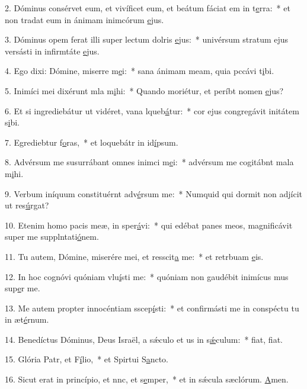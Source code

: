 2. Dóminus consérvet eum, et vivíficet eum, et beátum fáciat em in t\uline{e}rra:~* et non tradat eum in ánimam inimcórum \uline{e}jus.\par 
3. Dóminus opem ferat illi super lectum dolris \uline{e}jus:~* univérsum stratum ejus versásti in infirmtáte \uline{e}jus.\par 
4. Ego dixi: Dómine, miserre m\uline{e}i:~* sana ánimam meam, quia pccávi t\uline{i}bi.\par 
5. Inimíci mei dixérunt mla m\uline{i}hi:~* Quando moriétur, et períbt nomen \uline{e}jus?\par 
6. Et si ingrediebátur ut vidéret, vana lqueb\uline{á}tur:~* cor ejus congregávit initátem s\uline{i}bi.\par 
7. Egrediebtur f\uline{o}ras,~* et loquebátr in id\uline{í}psum.\par 
8. Advérsum me susurrábant omnes inimci m\uline{e}i:~* advérsum me cogitábnt mala m\uline{i}hi.\par 
9. Verbum iníquum constituérnt adv\uline{é}rsum me:~* Numquid qui dormit non adjícit ut res\uline{ú}rgat?\par 
10. Etenim homo pacis meæ, in  sper\uline{á}vi:~* qui edébat panes meos, magnificávit super me supplntati\uline{ó}nem.\par 
11. Tu autem, Dómine, miserére mei, et resscit\uline{a} me:~* et retrbuam \uline{e}is.\par 
12. In hoc cognóvi quóniam vlu\uline{í}sti me:~* quóniam non gaudébit inimícus mus sup\uline{e}r me.\par 
13. Me autem propter innocéntiam sscep\uline{í}sti:~* et confirmásti me in conspéctu tu in æt\uline{é}rnum.\par 
14. Benedíctus Dóminus, Deus Israël, a sǽculo et us in s\uline{ǽ}culum:~* fiat, f\uline{i}at.\par 
15. Glória Patr, et F\uline{í}lio,~* et Spirtui S\uline{a}ncto.\par 
16. Sicut erat in princípio, et nnc, et s\uline{e}mper,~* et in sǽcula sæclórum. \uline{A}men.\par 
